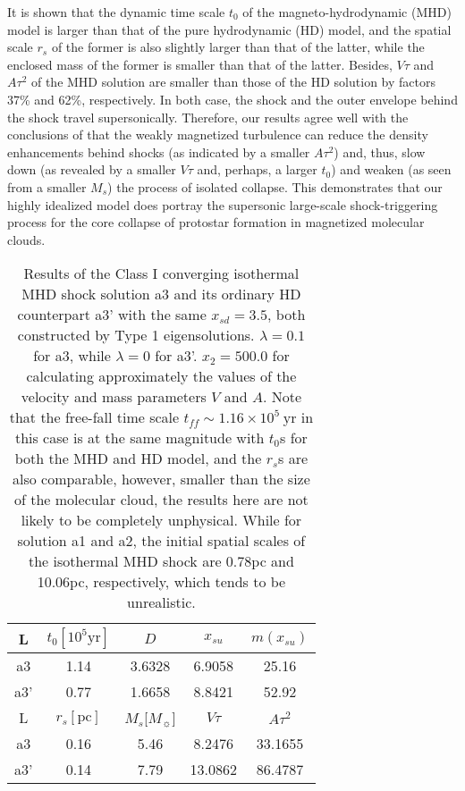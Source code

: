 \documentclass[fleqn,usenatbib]{mnras}
\begin{document}
It is shown that the dynamic time scale $t_{0}$ of the magneto-hydrodynamic (MHD) model is larger than that of the pure hydrodynamic (HD) model, and the spatial scale $r_{s}$ of the former is also slightly larger than that of the latter, while the enclosed mass of the former is smaller than that of the latter. Besides, $V\tau$ and $A\tau^{2}$ of the MHD solution are smaller than those of the HD solution by factors 37\% and 62\%, respectively. In both case, the shock and the outer envelope behind the shock travel supersonically. Therefore, our results agree well with the conclusions of \citet{heitsch2001gravitational} that the weakly magnetized turbulence can reduce the density enhancements behind shocks (as indicated by a smaller $A\tau^{2}$) and, thus, slow down (as revealed by a smaller $V\tau$ and, perhaps, a larger $t_{0}$) and weaken (as seen from a smaller $M_{s}$) the process of isolated collapse. This demonstrates that our highly idealized model does portray the supersonic large-scale shock-triggering process for the core collapse of protostar formation in magnetized molecular clouds.

\begin{table}
\centering
\caption{Results of the Class I converging isothermal MHD shock solution a3 and its ordinary HD counterpart a3' with the same $x_{sd}=3.5$, both constructed by Type 1 eigensolutions. $\lambda=0.1$ for a3, while $\lambda=0$ for a3'. $x_{2}=500.0$ for calculating approximately the values of the velocity and mass parameters $V$ and $A$. Note that the free-fall time scale $t_{ff}\sim 1.16\times 10^{5}~\mathrm{yr}$ in this case is at the same magnitude with $t_{0}$s for both the MHD and HD model, and the $r_{s}$s are also comparable, however, smaller than the size of the molecular cloud, the results here are not likely to be completely unphysical. While for solution a1 and a2, the initial spatial scales of the isothermal MHD shock are 0.78pc and 10.06pc, respectively, which tends to be unrealistic.} 
\begin{tabular}{ccccc}
\hline
L & $t_{0}[\mathrm{10^{5}yr}]$ & $D$ & $x_{su}$ & $m(x_{su})$\\
\hline
a3 & 1.14 & 3.6328 & 6.9058 & 25.16\\
a3' & 0.77 & 1.6658 & 8.8421 & 52.92\\
\hline
L & $r_{s}[\mathrm{pc}]$ & $M_{s}$[$M_{\sun}$] & $V\tau$ & $A\tau^{2}$ \\
\hline
a3 & 0.16 & 5.46 & 8.2476 & 33.1655\\
a3' & 0.14 & 7.79 & 13.0862 & 86.4787\\
\hline
\end{tabular}
\label{ta1}
\end{table}
\end{document}
